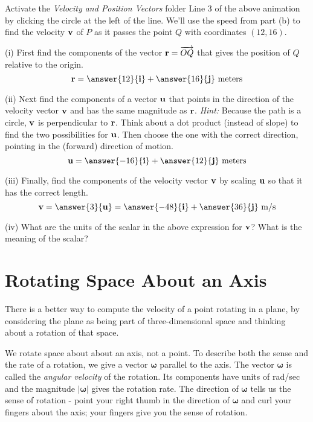 \documentclass{ximera}
\begin{document}
\begin{question}   \label{Q3456457l:Cross}
Activate the {\it Velocity and Position Vectors} folder Line 3 of the above animation by clicking the circle at the left of the line. We'll use the speed from part (b) to find the velocity ${\bf v}$ of $P$ as it passes the point $Q$ with coordinates $(12,16)$.

(i) First find the components of the vector ${\bf r}=\overrightarrow{OQ}$ that gives the position of $Q$ relative to the origin.
\[
    {\bf r} = \answer{12}{\bf i} + \answer{16}{\bf j} \text{ meters}
\]

(ii) Next find the components of a vector ${\bf u}$ that points in the direction of the velocity vector ${\bf v}$ and has the same magnitude as ${\bf r}$. {\it Hint:} Because the path is a circle, ${\bf v}$ is perpendicular to ${\bf r}$. Think about a dot product (instead of slope) to find the two possibilities for ${\bf u}$. Then choose the one with the correct direction, pointing in the (forward) direction of motion.
\[
    {\bf u} =  \answer{-16}{\bf i} + \answer{12}{\bf j} \text{ meters}
\]

(iii) Finally, find the components of the velocity vector ${\bf v}$ by scaling ${\bf u}$ so that it has the correct length.
\[
     {\bf v} = \answer{3} {\bf u} = \answer{-48}{\bf i} + \answer{36}{\bf j} \text{ m/s}
\]

(iv) What are the units of the scalar in the above expression for ${\bf v}$? What is the meaning of the scalar?

\end{question}  


 

\section{Rotating Space About an Axis}
There is a better way to compute the velocity of a point rotating in a plane, by considering the plane as being part of three-dimensional space and thinking about a rotation of that space.

We rotate space about about an axis, not a point. To describe both the sense and the rate of a rotation, we give a vector $\boldsymbol{\omega}$ parallel to the axis. The vector $\boldsymbol{\omega}$ is called the \emph{angular velocity} of the rotation. Its components have units of rad/sec and the magnitude $|\boldsymbol{\omega}|$ gives the rotation rate. The direction of $\boldsymbol{\omega}$ tells us the sense of rotation - point your right thumb in the direction of $\boldsymbol{\omega}$ and curl your fingers about the axis; your fingers give you the sense of rotation.
\end{document}
